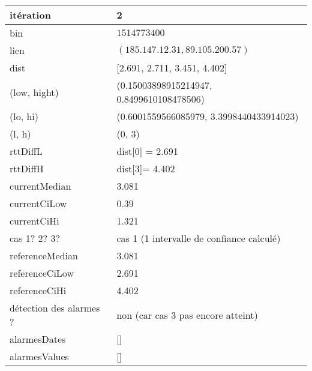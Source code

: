 	\begin{table}[H]
	\centering
	
	\begin{tabularx}{\linewidth}{|l|X| }
		\hline
		itération & 2	\\ \hline
		bin & $1514773400$ \\ \hline
		lien & $(185.147.12.31, 89.105.200.57)$  \\ \hline
		dist& [2.691, 2.711, 3.451, 4.402]	\\ \hline
		(low, hight)& (0.15003898915214947, 0.8499610108478506) 	\\ \hline
		(lo, hi)&(0.6001559566085979, 3.3998440433914023)  \\ \hline
		(l, h) & (0, 3) 	\\ \hline
		rttDiffL& dist[0] = 2.691	\\ \hline
		rttDiffH& dist[3]= 4.402	\\ \hline
		currentMedian& 3.081	\\ \hline
		currentCiLow&  0.39 	\\ \hline
		currentCiHi& 1.321	\\ \hline
		cas 1? 2? 3?& cas 1 (1 intervalle de confiance calculé)  \\ \hline
		referenceMedian& 3.081	\\ \hline
		referenceCiLow& 2.691	\\ \hline
		referenceCiHi&4.402	\\ \hline
		détection des alarmes ?& non (car cas 3 pas  encore atteint)	\\ \hline
		alarmesDates& []	\\ \hline
		alarmesValues& []	\\ \hline
		
		
	\end{tabularx}
\end{table}

